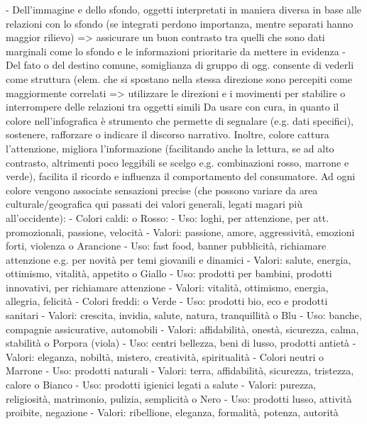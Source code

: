 -	Dell'immagine e dello sfondo, oggetti interpretati in maniera diversa in base alle relazioni con lo sfondo (se integrati perdono importanza, mentre separati hanno maggior rilievo) => assicurare un buon contrasto tra quelli che sono dati marginali come lo sfondo e le informazioni prioritarie da mettere in evidenza
-	Del fato o del destino comune, somiglianza di gruppo di ogg. consente di vederli come struttura (elem. che si spostano nella stessa direzione sono percepiti come maggiormente correlati => utilizzare le direzioni e i movimenti per stabilire o interrompere delle relazioni tra oggetti simili
Da usare con cura, in quanto il colore nell'infografica è strumento che permette di segnalare (e.g. dati specifici), sostenere, rafforzare o indicare il discorso narrativo. Inoltre, colore cattura l'attenzione, migliora l'informazione (facilitando anche la lettura, se ad alto contrasto, altrimenti poco leggibili se scelgo e.g. combinazioni rosso, marrone e verde), facilita il ricordo e influenza il comportamento del consumatore.
Ad ogni colore vengono associate sensazioni precise (che possono variare da area culturale/geografica qui passati dei valori generali, legati magari più all'occidente):
-	Colori caldi:
    o	Rosso:
        -	Uso: loghi, per attenzione, per att. promozionali, passione, velocità
        -	Valori: passione, amore, aggressività, emozioni forti, violenza
    o	Arancione
        -	Uso: fast food, banner pubblicità, richiamare attenzione e.g. per novità per temi giovanili e dinamici
        -	Valori: salute, energia, ottimismo, vitalità, appetito
    o	Giallo
        -	Uso: prodotti per bambini, prodotti innovativi, per richiamare attenzione
        -	Valori: vitalità, ottimismo, energia, allegria, felicità
        -	Colori freddi:
    o	Verde
        -	Uso: prodotti bio, eco e prodotti sanitari
        -	Valori: crescita, invidia, salute, natura, tranquillità
    o	Blu
        -	Uso: banche, compagnie assicurative, automobili
        -	Valori: affidabilità, onestà, sicurezza, calma, stabilità
    o	Porpora (viola)
        -	Uso: centri bellezza, beni di lusso, prodotti antietà
        -	Valori: eleganza, nobiltà, mistero, creatività, spiritualità
        -	Colori neutri
    o	Marrone
        -	Uso: prodotti naturali
        -	Valori: terra, affidabilità, sicurezza, tristezza, calore
    o	Bianco
        -	Uso: prodotti igienici legati a salute
        -	Valori: purezza, religiosità, matrimonio, pulizia, semplicità
    o	Nero
        -	Uso: prodotti lusso, attività proibite, negazione
        -	Valori: ribellione, eleganza, formalità, potenza, autorità
